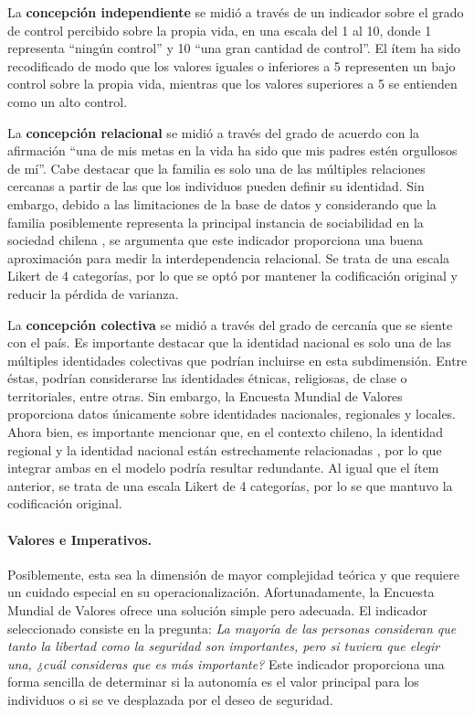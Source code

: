 \documentclass[12pt,oneside]{templates/facsothesis}
\begin{document}
La \textbf{concepción independiente} se midió a través de un indicador sobre el grado de control percibido sobre la propia vida, en una escala del 1 al 10, donde 1 representa ``ningún control'' y 10 ``una gran cantidad de control''. El ítem ha sido recodificado de modo que los valores iguales o inferiores a 5 representen un bajo control sobre la propia vida, mientras que los valores superiores a 5 se entienden como un alto control.

La \textbf{concepción relacional} se midió a través del grado de acuerdo con la afirmación ``una de mis metas en la vida ha sido que mis padres estén orgullosos de mí''. Cabe destacar que la familia es solo una de las múltiples relaciones cercanas a partir de las que los individuos pueden definir su identidad. Sin embargo, debido a las limitaciones de la base de datos y considerando que la familia posiblemente representa la principal instancia de sociabilidad en la sociedad chilena \citep{araujo2012}, se argumenta que este indicador proporciona una buena aproximación para medir la interdependencia relacional. Se trata de una escala Likert de 4 categorías, por lo que se optó por mantener la codificación original y reducir la pérdida de varianza.

La \textbf{concepción colectiva} se midió a través del grado de cercanía que se siente con el país. Es importante destacar que la identidad nacional es solo una de las múltiples identidades colectivas que podrían incluirse en esta subdimensión. Entre éstas, podrían considerarse las identidades étnicas, religiosas, de clase o territoriales, entre otras. Sin embargo, la Encuesta Mundial de Valores proporciona datos únicamente sobre identidades nacionales, regionales y locales. Ahora bien, es importante mencionar que, en el contexto chileno, la identidad regional y la identidad nacional están estrechamente relacionadas \citep{zuniga2010}, por lo que integrar ambas en el modelo podría resultar redundante. Al igual que el ítem anterior, se trata de una escala Likert de 4 categorías, por lo se que mantuvo la codificación original.

\hypertarget{valores-e-imperativos.}{%
\paragraph*{Valores e Imperativos.}\label{valores-e-imperativos.}}

Posiblemente, esta sea la dimensión de mayor complejidad teórica y que requiere un cuidado especial en su operacionalización. Afortunadamente, la Encuesta Mundial de Valores ofrece una solución simple pero adecuada. El indicador seleccionado consiste en la pregunta: \emph{La mayoría de las personas consideran que tanto la libertad como la seguridad son importantes, pero si tuviera que elegir una, ¿cuál consideras que es más importante?} Este indicador proporciona una forma sencilla de determinar si la autonomía es el valor principal para los individuos o si se ve desplazada por el deseo de seguridad.
\end{document}
